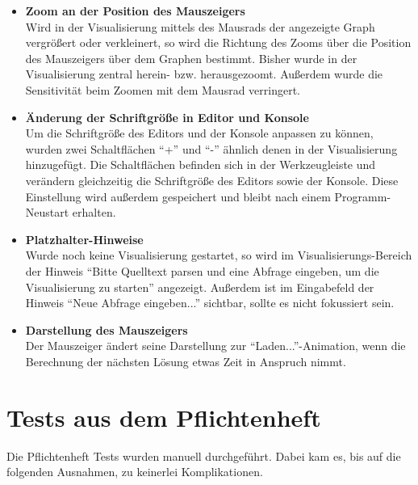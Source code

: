 \documentclass[parskip=full,11pt,twoside]{scrartcl}
\begin{document}
\begin{itemize}
  \item \textbf{Zoom an der Position des Mauszeigers}\\
        Wird in der Visualisierung mittels des Mausrads der angezeigte Graph vergrößert oder verkleinert, so wird die Richtung des Zooms über die Position des Mauszeigers über dem Graphen bestimmt. Bisher wurde in der Visualisierung zentral herein- bzw. herausgezoomt. Außerdem wurde die Sensitivität beim Zoomen mit dem Mausrad verringert.
  \item \textbf{Änderung der Schriftgröße in Editor und Konsole}\\
        Um die Schriftgröße des Editors und der Konsole anpassen zu können, wurden zwei Schaltflächen \enquote{+} und \enquote{-} ähnlich denen in der Visualisierung hinzugefügt. Die Schaltflächen befinden sich in der Werkzeugleiste und verändern gleichzeitig die Schriftgröße des Editors sowie der Konsole. Diese Einstellung wird außerdem gespeichert und bleibt nach einem Programm-Neustart erhalten.
  \item \textbf{Platzhalter-Hinweise}\\
        Wurde noch keine Visualisierung gestartet, so wird im Visualisierungs-Bereich der Hinweis \enquote{Bitte Quelltext parsen und eine Abfrage eingeben, um die Visualisierung zu starten} angezeigt. Außerdem ist im Eingabefeld der Hinweis \enquote{Neue Abfrage eingeben...} sichtbar, sollte es nicht fokussiert sein.
  \item \textbf{Darstellung des Mauszeigers}\\
        Der Mauszeiger ändert seine Darstellung zur \enquote{Laden...}-Animation, wenn die Berechnung der nächsten Lösung etwas Zeit in Anspruch nimmt.
\end{itemize}

\section{Tests aus dem Pflichtenheft}

Die Pflichtenheft Tests wurden manuell durchgeführt. Dabei kam es, bis auf die folgenden Ausnahmen, zu keinerlei Komplikationen.
\end{document}

